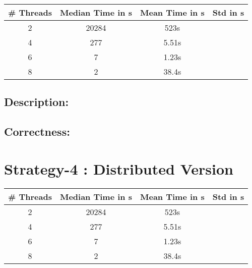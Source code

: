 \documentclass[12pt]{article}
\begin{document}
\begin{table}[h!]
    \begin{center}
      \begin{tabular}{|c|c|c|c|} %
      \hline
      \textbf{\# Threads} & \textbf{Median Time in s} & \textbf{Mean Time in s} & \textbf{Std in s}\\
        \hline  
        2 & 20284 & 523s &\\
        4 & 277 & 5.51s &\\
        6 & 7 & 1.23s &\\
        8 & 2 & 38.4s &\\
        \hline
      \end{tabular}
    \end{center}
  \end{table}

\subsection*{Description:}

\subsection*{Correctness:}

\section*{Strategy-4 : Distributed Version}

\begin{table}[H]
    \begin{center}
      \begin{tabular}{|c|c|c|c|} %
      \hline
      \textbf{\# Threads} & \textbf{Median Time in s} & \textbf{Mean Time in s} & \textbf{Std in s}\\
        \hline  
        2 & 20284 & 523s &\\
        4 & 277 & 5.51s &\\
        6 & 7 & 1.23s &\\
        8 & 2 & 38.4s &\\
        \hline
      \end{tabular}
    \end{center}
  \end{table}
\end{document}

